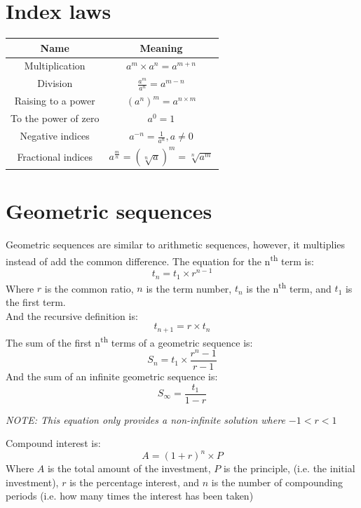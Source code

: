 \documentclass{book}
\begin{document}
\chapter{Index laws}
\begin{center}
	\begin{tabular}{c|c}
		Name                 & Meaning                                             \\ \hline
		Multiplication       & $a^m \times a^n = a^{m + n}$                        \\
		Division             & $\frac{a^m}{a^n} = a^{m - n}$                       \\
		Raising to a power   & $(a^n)^m = a^{n \times m}$                          \\
		To the power of zero & $a^0 = 1$                                           \\
		Negative indices     & $a^{-n} = \frac{1}{a^n}, a \not = 0$                \\
		Fractional indices   & $a^{\frac{m}{n}} = (\sqrt[n]{a})^m = \sqrt[n]{a^m}$
	\end{tabular}
\end{center}

\chapter{Geometric sequences}
Geometric sequences are similar to arithmetic sequences, however, it multiplies instead of add the common difference.  The equation for the n\textsuperscript{th} term is:
\[
	t_n = t_1 \times r^{n - 1}
\]
Where $r$ is the common ratio, $n$ is the term number, $t_n$ is the n\textsuperscript{th} term, and $t_1$ is the first term.\\
And the recursive definition is:
\[
	t_{n + 1} = r \times t_n
\]
The sum of the first n\textsuperscript{th} terms of a geometric sequence is:
\[
	S_n = t_1 \times \frac{r^n - 1}{r - 1}
\]
And the sum of an infinite geometric sequence is:
\[
	S_{\infty} = \frac{t_1}{1 - r}
\]
\begin{center}
	\emph{NOTE: This equation only provides a non-infinite solution where $-1 < r < 1$}
\end{center}

Compound interest is:
\[
	A = (1 + r)^n \times P
\]
Where $A$ is the total amount of the investment, $P$ is the principle, (i.e. the initial investment), $r$ is the percentage interest, and $n$ is the number of compounding periods (i.e. how many times the interest has been taken)
\end{document}
